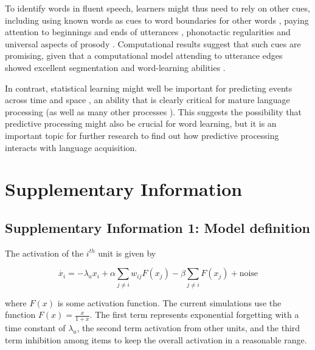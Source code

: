 \documentclass[
]{article}
\begin{document}
To identify words in fluent speech, learners might thus need to rely on
other cues, including using known words as cues to word boundaries for
other words \citep{Bortfeld2005, Brent2001, Mersad2012}, paying
attention to beginnings and ends of utterances
\citep{Monaghan2010, Seidl2008, Shukla2007}, phonotactic regularities
\citep{McQueen1998} and universal aspects of prosody
\citep{Brentari2011, Christophe2001, Endress-cross-seg, Pilon1981}.
Computational results suggest that such cues are promising, given that a
computational model attending to utterance edges showed excellent
segmentation and word-learning abilities \citep{Monaghan2010}.

In contrast, statistical learning might well be important for predicting
events across time
\citep{Endress-stat-recall, Morgan2019, Sherman2020, Turk-Browne2010, Verosky2021}
and space \citep{Theeuwes2022}, an ability that is clearly critical for
mature language processing \citep{Levy2008, Trueswell1999} (as well as
many other processes \citep{Clark2013, Friston2010, Keller2018}). This
suggests the possibility that predictive processing might also be
crucial for word learning, but it is an important topic for further
research to find out how predictive processing interacts with language
acquisition.

\clearpage

\hypertarget{supplementary-information}{%
\section{Supplementary Information}\label{supplementary-information}}

\hypertarget{supplementary-information-1-model-definition}{%
\subsection{Supplementary Information 1: Model
definition}\label{supplementary-information-1-model-definition}}

The activation of the \(i^{th}\) unit is given by

\[
\dot{x_i} = -\lambda_a x_i + \alpha \sum_{j \neq i} w_{ij} F(x_j) - \beta \sum_{j \neq i} F(x_j) + \text{noise}
\]

where \(F(x)\) is some activation function. The current simulations use
the function \(F(x) = \frac{x}{1 + x}\). The first term represents
exponential forgetting with a time constant of \(\lambda_a\), the second
term activation from other units, and the third term inhibition among
items to keep the overall activation in a reasonable range.
\end{document}
